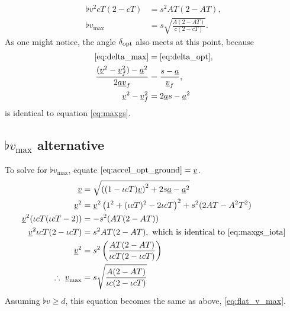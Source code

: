 \begin{align*}
\flat{v}^2 cT(2 - cT) &= s^2 AT(2 - AT),\\
\flat{v}_{\max} &= s \sqrt{\frac{A(2 - AT)}{c(2 - cT)}}.
\end{align*}
As one might notice, the angle $\delta_{\operatorname{opt}}$ also meets at this point, because
\begin{align*}
\eqref{eq:delta_max} &= \eqref{eq:delta_opt},\\
\frac{(\flat{v}^2 - \flat{v}_f^2) - \flat{a}^2}{2 \flat{a} \flat{v}_f} &= \frac{s - \flat{a}}{\flat{v}_f},\\
\flat{v}^2 - \flat{v}_f^2 &= 2 \flat{a} s - \flat{a}^2
\end{align*}
is identical to equation \eqref{eq:maxgs}.


\subsection{\texorpdfstring{$\flat{v}_{\max}$ alternative}{flat v\_max alternative}}
\label{app:derive_flat_v_max_alternative}
To solve for $\flat{v}_{\max}$, equate $\eqref{eq:accel_opt_ground} = \flat{v}$.
\begin{align*}
\flat{v} &= \sqrt{\left((1 - \iota cT)\flat{v} \right)^2 + 2s\flat{a} - \flat{a}^2}\\
\flat{v}^2 &= \flat{v}^2\left(1^2 + (\iota cT)^2 - 2\iota cT \right)^2 + s^2(2AT - A^2T^2)\\
\flat{v}^2(\iota cT(\iota cT - 2)) &= -s^2(AT(2 - AT))\\
\flat{v}^2\iota cT(2 - \iota cT) &= s^2AT(2 - AT),\ \text{which is identical to}\ \eqref{eq:maxgs_iota}\\
\flat{v}^2 &= s^2 \left(\frac{AT(2 - AT)}{\iota cT(2 - \iota cT)} \right)\\
\therefore\ \flat{v}_{\max} &= s\sqrt{\frac{A(2 - AT)}{\iota c(2 - \iota cT)}}
\end{align*}
Assuming $\flat{v} \ge d$, this equation becomes the same as above, \eqref{eq:flat_v_max}.

